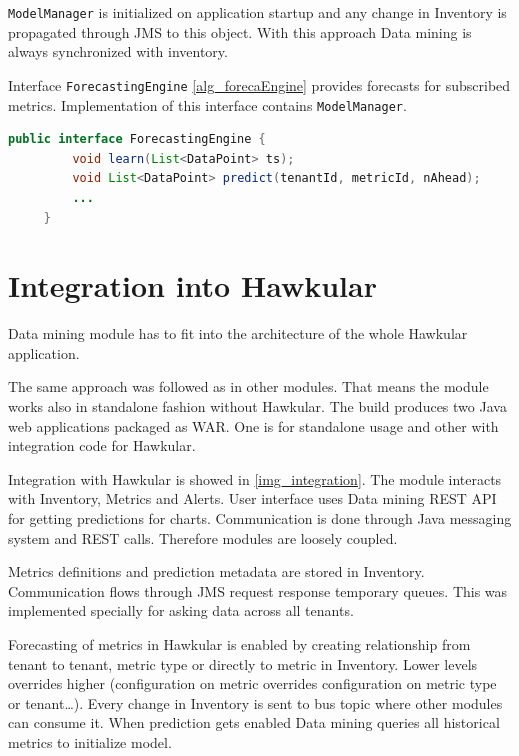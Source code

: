     \texttt{ModelManager} is initialized on application startup and any change in
    Inventory is propagated through JMS to this object. With this approach Data mining is
    always synchronized with inventory.

    Interface \texttt{ForecastingEngine} \ref{alg_forecaEngine} provides forecasts for
    subscribed metrics. Implementation of this interface contains \texttt{ModelManager}.

    \begin{lstlisting}[caption={Interface Forecasting Engine}, language=Java, label={alg_forecaEngine}]
     public interface ForecastingEngine {
         void learn(List<DataPoint> ts);
         void List<DataPoint> predict(tenantId, metricId, nAhead);
         ...
     }
    \end{lstlisting}


    \section{Integration into Hawkular}
    Data mining module has to fit into the architecture of the whole Hawkular application.

    The same approach was followed as in other modules. That means the module 
    works also in standalone fashion without Hawkular. The build produces two Java
    web applications packaged as WAR. One is for standalone usage and other with
    integration code for Hawkular.

    Integration with Hawkular is showed in \ref{img_integration}.
    The module interacts with Inventory, Metrics and Alerts. User interface uses Data
    mining REST API for getting predictions for charts. Communication is done through 
    Java messaging system and REST calls. Therefore modules are
    loosely coupled.

    Metrics definitions and prediction metadata are stored in Inventory.
    Communication flows through JMS request response temporary queues. This was
    implemented specially for asking data across all tenants.

    Forecasting of 
    metrics in Hawkular is enabled by creating relationship from tenant to tenant, metric type
    or directly to metric in Inventory. Lower levels overrides higher (configuration on metric overrides
    configuration on metric type or tenant\dots). Every change in Inventory is sent to bus topic
    where other modules can consume it. When prediction gets enabled Data mining queries all
    historical metrics to initialize model.

